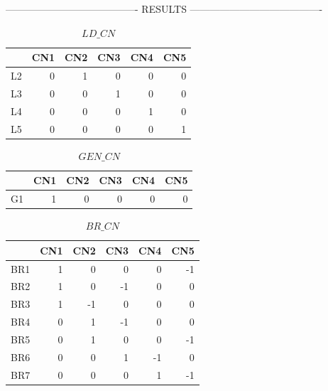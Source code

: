 \documentclass[nols,a4paper,twoside,notoc,fleqn]{tufte-book}
\begin{document}
---------------------------------------- RESULTS ----------------------------------------

\begin{table}[h!]
	\begin{tabular}{lrrrrr}
		\toprule
		{} &  CN1 &  CN2 &  CN3 &  CN4 &  CN5 \\
		\midrule
		L2 &    0 &    1 &    0 &    0 &    0 \\
		L3 &    0 &    0 &    1 &    0 &    0 \\
		L4 &    0 &    0 &    0 &    1 &    0 \\
		L5 &    0 &    0 &    0 &    0 &    1 \\
		\bottomrule
	\end{tabular}
\caption{$LD\_CN$}
\end{table}








\begin{table}[h!]
	\begin{tabular}{lrrrrr}
		\toprule
		{} &  CN1 &  CN2 &  CN3 &  CN4 &  CN5 \\
		\midrule
		G1 &    1 &    0 &    0 &    0 &    0 \\
		\bottomrule
	\end{tabular}
\caption{$GEN\_CN$}
\end{table}




\begin{table}[h!]
	\begin{tabular}{lrrrrr}
		\toprule
		{} &  CN1 &  CN2 &  CN3 &  CN4 &  CN5 \\
		\midrule
		BR1 &    1 &    0 &    0 &    0 &   -1 \\
		BR2 &    1 &    0 &   -1 &    0 &    0 \\
		BR3 &    1 &   -1 &    0 &    0 &    0 \\
		BR4 &    0 &    1 &   -1 &    0 &    0 \\
		BR5 &    0 &    1 &    0 &    0 &   -1 \\
		BR6 &    0 &    0 &    1 &   -1 &    0 \\
		BR7 &    0 &    0 &    0 &    1 &   -1 \\
		\bottomrule
	\end{tabular}
\caption{$BR\_CN$}
\end{table}
\end{document}
